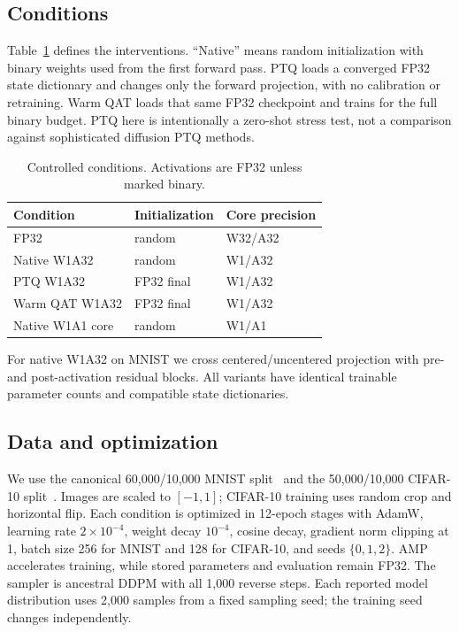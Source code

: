 \documentclass[conference]{IEEEtran}
\begin{document}
\subsection{Conditions}

Table~\ref{tab:conditions} defines the interventions. ``Native'' means random
initialization with binary weights used from the first forward pass. PTQ loads a
converged FP32 state dictionary and changes only the forward projection, with no
calibration or retraining. Warm QAT loads that same FP32 checkpoint and trains for
the full binary budget. PTQ here is intentionally a zero-shot stress test, not a
comparison against sophisticated diffusion PTQ methods.

\begin{table}[t]
\centering
\caption{Controlled conditions. Activations are FP32 unless marked binary.}
\label{tab:conditions}
\small
\begin{tabular}{lll}
\toprule
Condition & Initialization & Core precision \\
\midrule
FP32 & random & W32/A32 \\
Native W1A32 & random & W1/A32 \\
PTQ W1A32 & FP32 final & W1/A32 \\
Warm QAT W1A32 & FP32 final & W1/A32 \\
Native W1A1 core & random & W1/A1 \\
\bottomrule
\end{tabular}
\end{table}

For native W1A32 on MNIST we cross centered/uncentered projection with pre- and
post-activation residual blocks. All variants have identical trainable parameter
counts and compatible state dictionaries.

\subsection{Data and optimization}

We use the canonical 60,000/10,000 MNIST split~\cite{lecun1998mnist} and the
50,000/10,000 CIFAR-10 split~\cite{krizhevsky2009cifar}. Images are scaled to
$[-1,1]$; CIFAR-10 training uses random crop and horizontal flip. Each condition
is optimized in 12-epoch stages with AdamW, learning rate $2\times10^{-4}$, weight decay
$10^{-4}$, cosine decay, gradient norm clipping at 1, batch size 256 for MNIST and
128 for CIFAR-10, and seeds $\{0,1,2\}$. AMP accelerates training, while stored
parameters and evaluation remain FP32. The sampler is ancestral DDPM with all
1,000 reverse steps. Each reported model distribution uses 2,000 samples from a
fixed sampling seed; the training seed changes independently.
\end{document}
